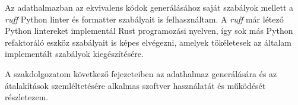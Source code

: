 Az adathalmazban az ekvivalens kódok generálásához saját szabályok mellett
a \emph{ruff} Python linter és formatter
\cite{Ruff} szabályait is felhasználtam.
A \emph{ruff} már létező Python lintereket implementál Rust programozási nyelven,
így sok más Python refaktoráló eszköz szabályait is képes elvégezni,
amelyek tökéletesek az általam implementált szabályok kiegészítésére.

A szakdolgozatom következő fejezeteiben az adathalmaz generálására és az átalakítások
szemléltetésére alkalmas szoftver használatát és működését részletezem.


